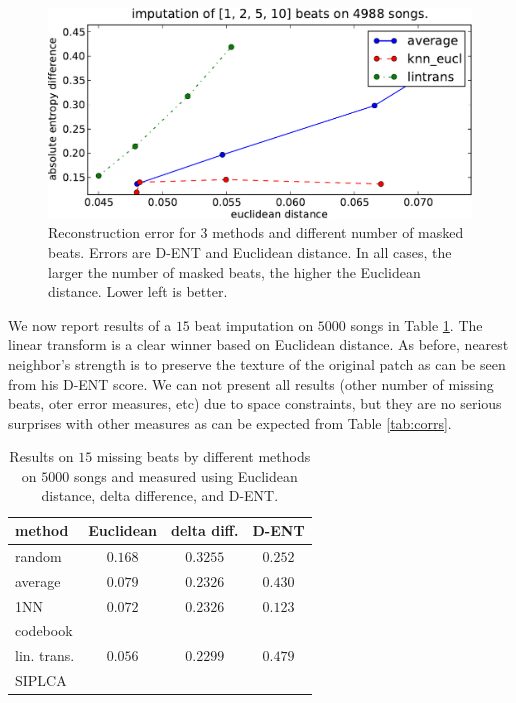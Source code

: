 \documentclass{article}
\begin{document}
\begin{figure}[t]
\begin{center}
\includegraphics[width=.8\columnwidth]{recon_score_in_2d_5k}
\end{center}
\caption{Reconstruction error for $3$ methods and different
number of masked beats. Errors are D-ENT and Euclidean
distance. In all cases, the larger the number of masked beats,
the higher the Euclidean distance. Lower left is better.
\label{fig:2dscore}}
\end{figure}

We now report results of a $15$ beat imputation on $5000$ songs in
Table \ref{tab:res}. The linear transform is a clear winner based on
Euclidean distance. As before, nearest neighbor's strength is to
preserve the texture of the original patch as can be seen from his
D-ENT score. We can not present all results (other number of missing
beats, oter error measures, etc) due to space constraints, but they
are no serious surprises with other measures as can be expected from
Table \ref{tab:corrs}.

\begin{table}[t]
\begin{small}
\begin{center}
\begin{tabular}{|l||c|c|c|} \hline
method & Euclidean & delta diff. & D-ENT \\ \hline
random & $0.168$ & $0.3255$ & $0.252$ \\
average & $0.079$ & $0.2326$ & $0.430$ \\ \hline
1NN & $0.072$ & $0.2326$ & $\mathbf{0.123}$ \\
codebook & & & \\ \hline
lin. trans. & $\mathbf{0.056}$ & $0.2299$ & $0.479$ \\
SIPLCA & & & \\ \hline
\end{tabular}
\caption{Results on $15$ missing beats by different methods
on $5000$ songs and measured using Euclidean distance, delta
difference, and D-ENT.
\label{tab:res}}
\end{center}
\end{small}
\end{table}
\end{document}
